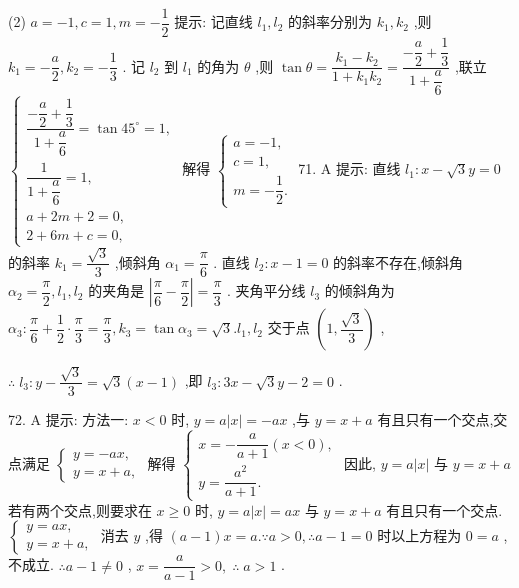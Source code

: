 (2) $a =  - 1,c = 1,m =  - \dfrac{1}{2}$ 提示: 记直线 ${l}_{1},{l}_{2}$ 的斜率分别为 ${k}_{1},{k}_{2}$ ,则 ${k}_{1} =  - \dfrac{a}{2},{k}_{2} =  - \dfrac{1}{3}$ . 记 ${l}_{2}$ 到 ${l}_{1}$ 的角为 $\theta$ ,则 $\tan \theta  = \dfrac{{k}_{1} - {k}_{2}}{1 + {k}_{1}{k}_{2}} = \dfrac{-\dfrac{a}{2} + \dfrac{1}{3}}{1 + \dfrac{a}{6}}$ ,联立 $\left\{  \begin{array}{l} \dfrac{-\dfrac{a}{2} + \dfrac{1}{3}}{1 + \dfrac{a}{6}} = \tan {45}^{ \circ  } = 1, \\  \dfrac{1}{1 + \dfrac{a}{6}} = 1, \\  a + {2m} + 2 = 0, \\  2 + {6m} + c = 0, \end{array}\right.$ 解得 $\left\{  \begin{array}{l} a =  - 1, \\  c = 1, \\  m =  - \dfrac{1}{2}. \end{array}\right.$ 71. A 提示: 直线 ${l}_{1} : x - \sqrt{3}y = 0$ 的斜率 ${k}_{1} = \dfrac{\sqrt{3}}{3}$ ,倾斜角 ${\alpha }_{1} = \dfrac{\pi }{6}$ . 直线 ${l}_{2} : x - 1 = 0$ 的斜率不存在,倾斜角 ${\alpha }_{2} = \dfrac{\pi }{2},{l}_{1},{l}_{2}$ 的夹角是 $\left| {\dfrac{\pi }{6} - \dfrac{\pi }{2}}\right|  = \dfrac{\pi }{3}$ . 夹角平分线 ${l}_{3}$ 的倾斜角为 ${\alpha }_{3} : \dfrac{\pi }{6} + \dfrac{1}{2} \cdot  \dfrac{\pi }{3} = \dfrac{\pi }{3},{k}_{3} = \tan {\alpha }_{3} = \sqrt{3}.{l}_{1},{l}_{2}$ 交于点 $\left( {1,\dfrac{\sqrt{3}}{3}}\right)$ ,

$\therefore \;{l}_{3} : y - \dfrac{\sqrt{3}}{3} = \sqrt{3}\left( {x - 1}\right)$ ,即 ${l}_{3} : {3x} - \sqrt{3}y - 2 = 0$ .

72. A 提示: 方法一: $x < 0$ 时, $y = a\left| x\right|  =  - {ax}$ ,与 $y = x + a$ 有且只有一个交点,交点满足 $\left\{  \begin{array}{l} y =  - {ax}, \\  y = x + a, \end{array}\right.$ 解得 $\left\{  \begin{array}{l} x =  - \dfrac{a}{a + 1}\left( {x < 0}\right) , \\  y = \dfrac{{a}^{2}}{a + 1}. \end{array}\right.$ 因此, $y = a\left| x\right|$ 与 $y = x + a$ 若有两个交点,则要求在 $x \geq  0$ 时, $y = a\left| x\right|  = {ax}$ 与 $y = x + a$ 有且只有一个交点. $\left\{  \begin{array}{l} y = {ax}, \\  y = x + a, \end{array}\right.$ 消去 $y$ ,得 $\left( {a - 1}\right) x = a.\because a > 0,\therefore a - 1 = 0$ 时以上方程为 $0 = a$ ,不成立. $\therefore a - 1 \neq  0$ , $x = \dfrac{a}{a - 1} > 0,\;\therefore \;a > 1$ .

